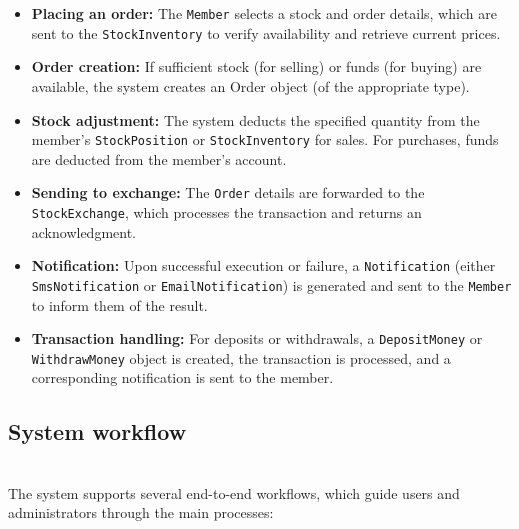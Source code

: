 \begin{itemize}
\item
\protect{}\label{7llBsW3vPB6sWqAIQfyUH}
\textbf{Placing an order:} The \texttt{Member} selects a stock and order details, which are sent to the \texttt{StockInventory} to verify availability and retrieve current prices.
\item
\protect{}\label{61jtQ0JO9fZJTD8ytoXHF}
\textbf{Order creation:} If sufficient stock (for selling) or funds (for buying) are available, the system creates an Order object (of the appropriate type).
\item
\protect{}\label{JJBls31ZtpyQ7pwxrs-u-}
\textbf{Stock adjustment:} The system deducts the specified quantity from the member's \texttt{StockPosition} or \texttt{StockInventory} for sales. For purchases, funds are deducted from the member's account.
\item
\protect{}\label{kI2hjlEtDeFSYEUSjIzta}
\textbf{Sending to exchange:} The \texttt{Order} details are forwarded to the \texttt{StockExchange}, which processes the transaction and returns an acknowledgment.
\item
\protect{}\label{dgBCV1Wup1xjmnm2mcwU9}
\textbf{Notification:} Upon successful execution or failure, a \texttt{Notification} (either \texttt{SmsNotification} or \texttt{EmailNotification}) is generated and sent to the \texttt{Member} to inform them of the result.
\item
\protect{}\label{EmwKePPWx8W1kTym94t0T}
\textbf{Transaction handling:} For deposits or withdrawals, a \texttt{DepositMoney} or \texttt{WithdrawMoney} object is created, the transaction is processed, and a corresponding notification is sent to the member.
\end{itemize}

\subsection{System workflow}\label{aTAge_INvDUrkvOJAejvt}
\\
The system supports several end-to-end workflows, which guide users and administrators through the main processes:

